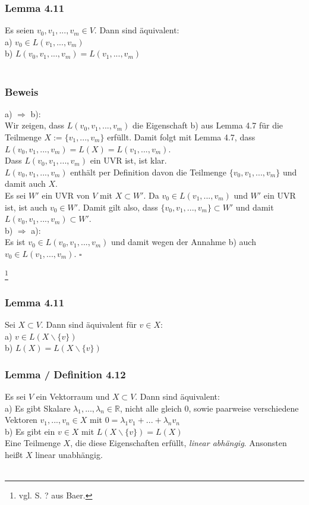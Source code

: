 \documentclass{article}
\begin{document}
\subsubsection*{Lemma 4.11}
Es seien $v_0, v_1, ..., v_m \in V$. Dann sind äquivalent: \\
a) $v_0 \in L(v_1,...,v_m)$ \\
b) $L(v_0, v_1,...,v_m) = L(v_1,...,v_m)$ \\
\\
\subsubsection*{Beweis}
a) $\Rightarrow$ b): \\
Wir zeigen, dass $L(v_0, v_1,...,v_m)$ die Eigenschaft b) aus Lemma 4.7 für die Teilmenge $X:= \{v_1,...,v_m\}$ erfüllt.
Damit folgt mit Lemma 4.7, dass $L(v_0, v_1,...,v_m) = L(X) = L(v_1,...,v_m)$. \\
Dass $L(v_0, v_1,...,v_m)$ ein UVR ist, ist klar. \\
$L(v_0, v_1,...,v_m)$ enthält per Definition davon die Teilmenge $\{v_0, v_1,...,v_m\}$ und damit auch $X$. \\
Es sei $W'$ ein UVR von $V$ mit $X \subset W'$. Da $v_0 \in L(v_1,...,v_m)$ und $W'$ ein UVR ist, ist auch $v_0 \in W'$. 
Damit gilt also, dass $\{v_0, v_1,...,v_m\} \subset W'$ und damit $L(v_0, v_1,...,v_m) \subset W'$. \\
b) $\Rightarrow$ a): \\
Es ist $v_0 \in L(v_0, v_1,...,v_m)$ und damit wegen der Annahme b) auch $v_0 \in L(v_1,...,v_m)$. $\square$ \\




\newpage
\date{Mittwoch, 08.01.24} \footnote{vgl. S. ? aus Baer.}

\subsubsection*{Lemma 4.11}
Sei $X \subset V$. Dann sind äquivalent für $v \in X$: \\
a) $v \in L(X\backslash \{v\})$ \\
b) $L(X) = L(X \backslash \{v\})$ \\

\subsubsection*{Lemma / Definition 4.12}
Es sei $V$ ein Vektorraum und $X \subset V$. Dann sind äquivalent: \\
a) Es gibt Skalare $\lambda_1,...,\lambda_n \in \mathbb{R}$, nicht alle gleich $0$, sowie paarweise verschiedene Vektoren $v_1,...,v_n \in X$ mit $0 = \lambda_1 v_1 + ... + \lambda_n v_n$ \\
b) Es gibt ein $v \in X$ mit $L(X\backslash \{v\}) = L(X)$ \\
Eine Teilmenge $X$, die diese Eigenschaften erfüllt, \textit{linear abhängig}. Ansonsten heißt $X$ linear unabhängig. \\
\\
\end{document}
